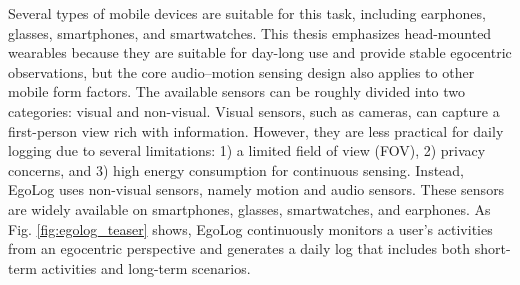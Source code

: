 Several types of mobile devices are suitable for this task, including earphones, glasses, smartphones, and smartwatches. This thesis emphasizes head-mounted wearables because they are suitable for day-long use and provide stable egocentric observations, but the core audio--motion sensing design also applies to other mobile form factors. The available sensors can be roughly divided into two categories: visual and non-visual.
Visual sensors, such as cameras, can capture a first-person view rich with information. However, they are less practical for daily logging due to several limitations: 1) a limited field of view (FOV), 2) privacy concerns, and 3) high energy consumption for continuous sensing.
Instead, EgoLog uses non-visual sensors, namely motion and audio sensors. These sensors are widely available on smartphones, glasses, smartwatches, and earphones. As Fig. \ref{fig:egolog_teaser} shows, EgoLog continuously monitors a user's activities from an egocentric perspective and generates a daily log that includes both short-term activities and long-term scenarios.




